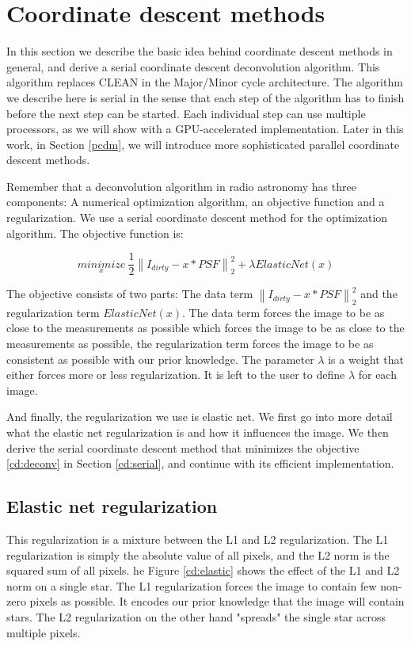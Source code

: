 \section{Coordinate descent methods}\label{cd}
In this section we describe the basic idea behind coordinate descent methods in general, and derive a serial coordinate descent deconvolution algorithm. This algorithm replaces CLEAN in the Major/Minor cycle architecture. The algorithm we describe here is serial in the sense that each step of the algorithm has to finish before the next step can be started. Each individual step can use multiple processors, as we will show with a GPU-accelerated implementation. Later in this work, in Section \ref{pcdm}, we will introduce more sophisticated parallel coordinate descent methods.

Remember that a deconvolution algorithm in radio astronomy has three components: A numerical optimization algorithm, an objective function and a regularization. We use a serial coordinate descent method for the optimization algorithm. The objective function is:

\begin{equation}\label{cd:deconv}
\underset{x}{minimize} \: \frac{1}{2} \left \| I_{dirty} - x * PSF \right \|_2^2 + \lambda ElasticNet(x)
\end{equation}

The objective consists of two parts: The data term $\left \| I_{dirty} - x * PSF \right \|_2^2$ and the regularization term $ElasticNet(x)$. The data term forces the image to be as close to the measurements as possible which forces the image to be as close to the measurements as possible, the regularization term forces the image to be as consistent as possible with our prior knowledge. The parameter $\lambda$ is a weight that either forces more or less regularization. It is left to the user to define $\lambda$ for each image. 

And finally, the regularization we use is elastic net. We first go into more detail what the elastic net regularization is and how it influences the image. We then derive the serial coordinate descent method that minimizes the objective \eqref{cd:deconv} in Section \ref{cd:serial}, and continue with its efficient implementation.


\subsection{Elastic net regularization} \label{cd:reg}
This regularization is a mixture between the L1 and L2 regularization.  The L1 regularization is simply the absolute value of all pixels, and the L2 norm is the squared sum of all pixels. he Figure \ref{cd:elastic} shows the effect of the L1 and L2 norm on a single star. The L1 regularization forces the image to contain few non-zero pixels as possible. It encodes our prior knowledge that the image will contain stars. The L2 regularization on the other hand "spreads" the single star across multiple pixels. 

